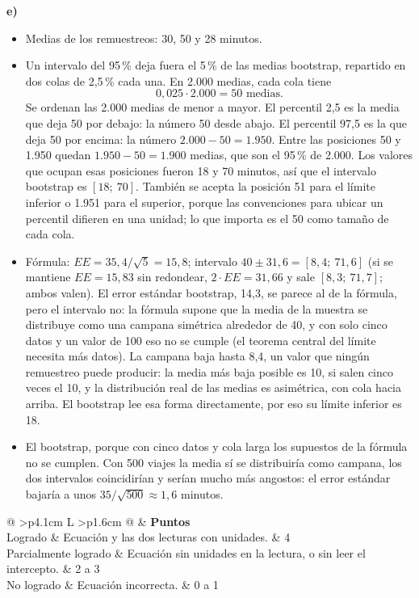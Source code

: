 \documentclass[11pt]{article}
\makeatletter
\newcommand{\bloque}[1]{\vspace{6pt}{\bfseries #1}\vspace{2pt}\par}
\newcommand{\rubrica}[7]{%
\vspace{4pt}
\begin{tabularx}{\linewidth}{@{} >{\bfseries}p{4.1cm} L >{\raggedleft\arraybackslash}p{1.6cm} @{}}
\toprule
\multicolumn{2}{@{}l}{\textbf{#1}} & \textbf{Puntos} \\
\midrule
\rowcolor{grisclaro} Logrado & #2 & #3 \\
Parcialmente logrado & #4 & #5 \\
\rowcolor{grisclaro} No logrado & #6 & #7 \\
\bottomrule
\end{tabularx}
\vspace{6pt}
}
\makeatother
\begin{document}
\medskip
\textbf{e)}
\begin{itemize}
\item[(i)] Medias de los remuestreos: 30, 50 y 28 minutos.
\item[(ii)] Un intervalo del 95\,\% deja fuera el 5\,\% de las medias bootstrap, repartido en dos colas de 2,5\,\% cada una. En 2.000 medias, cada cola tiene
\[
0{,}025 \cdot \text{2.000} = 50 \text{ medias}.
\]
Se ordenan las 2.000 medias de menor a mayor. El percentil 2,5 es la media que deja 50 por debajo: la número 50 desde abajo. El percentil 97,5 es la que deja 50 por encima: la número $\text{2.000} - 50 = \text{1.950}$. Entre las posiciones 50 y 1.950 quedan $\text{1.950} - 50 = \text{1.900}$ medias, que son el 95\,\% de 2.000. Los valores que ocupan esas posiciones fueron 18 y 70 minutos, así que el intervalo bootstrap es $[18;\ 70]$. También se acepta la posición 51 para el límite inferior o 1.951 para el superior, porque las convenciones para ubicar un percentil difieren en una unidad; lo que importa es el 50 como tamaño de cada cola.
\item[(iii)] Fórmula: $EE = 35{,}4 / \sqrt{5} = 15{,}8$; intervalo $40 \pm 31{,}6 = [8{,}4;\ 71{,}6]$ (si se mantiene $EE = 15{,}83$ sin redondear, $2 \cdot EE = 31{,}66$ y sale $[8{,}3;\ 71{,}7]$; ambos valen). El error estándar bootstrap, 14,3, se parece al de la fórmula, pero el intervalo no: la fórmula supone que la media de la muestra se distribuye como una campana simétrica alrededor de 40, y con solo cinco datos y un valor de 100 eso no se cumple (el teorema central del límite necesita más datos). La campana baja hasta 8,4, un valor que ningún remuestreo puede producir: la media más baja posible es 10, si salen cinco veces el 10, y la distribución real de las medias es asimétrica, con cola hacia arriba. El bootstrap lee esa forma directamente, por eso su límite inferior es 18.
\item[(iv)] El bootstrap, porque con cinco datos y cola larga los supuestos de la fórmula no se cumplen. Con 500 viajes la media sí se distribuiría como campana, los dos intervalos coincidirían y serían mucho más angostos: el error estándar bajaría a unos $35 / \sqrt{500} \approx 1{,}6$ minutos.
\end{itemize}

\bloque{Rúbrica}

\rubrica{a) Ecuación y lectura (4 puntos)}
{Ecuación y las dos lecturas con unidades.}{4}
{Ecuación sin unidades en la lectura, o sin leer el intercepto.}{2 a 3}
{Ecuación incorrecta.}{0 a 1}
\end{document}
